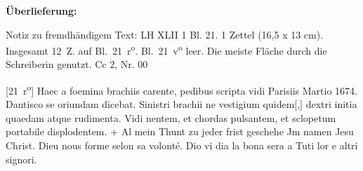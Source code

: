 \begin{ledgroupsized}[r]{120mm}%
\footnotesize%
\pstart%
\noindent\textbf{\"{U}berlieferung:}%
\pend%
\end{ledgroupsized}%
\begin{ledgroupsized}[r]{112mm}%
\footnotesize%
\pstart%
\parindent -8mm%
%
Notiz zu fremdhändigem Text: LH XLII 1 Bl. 21. 1 Zettel (16,5 x 13 cm).
Insgesamt 12~Z. auf Bl.~21~r\textsuperscript{o}.
Bl.~21~v\textsuperscript{o} leer.
Die meiste Fl\"{a}che durch die Schreiberin genutzt.
\newline%
Cc 2, Nr. 00%
\pend%
\end{ledgroupsized}%
%
%
%
\vspace*{8mm}
\pstart%
\normalsize%
\noindent%
[21~r\textsuperscript{o}] Haec a foemina brachiis carente, pedibus\protect{} scripta
vidi Parisiis\protect{} Martio 1674.
Dantisco\protect{} se oriundam dicebat.
Sinistri brachii\protect{} ne vestigium quidem[,] dextri initia quaedam atque rudimenta.
Vidi nentem, et chordas\protect{} pulsantem,
et sclopetum\protect{} portabile displodentem.%
\pend%
\vspace*{1.0em}%
\pstart%
%
\newline%
+
\newline%
Al mein Thunt zu jeder frist geschehe Jm namen Jesu Christ.%
\newline%
Dieu nous forme selon sa volonté.%
\newline%
Dio vi dia la bona sera a Tuti lor e altri signori.%
\pend%
